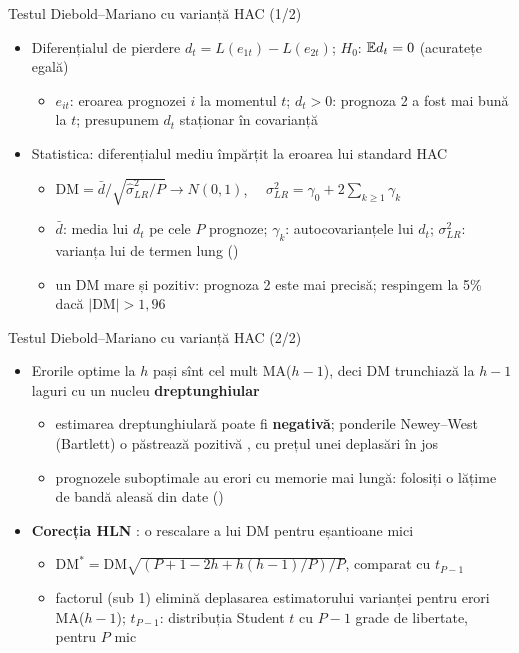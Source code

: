 \begin{frame}{Testul Diebold--Mariano cu varianță HAC (1/2)}
\itemsize{\small}
\begin{itemize}
    \item Diferențialul de pierdere $d_t = L(e_{1t}) - L(e_{2t})$; $H_0$: $\mathbb{E} d_t = 0$ (acuratețe egală)
    \begin{itemize}
        \item $e_{it}$: eroarea prognozei $i$ la momentul $t$; $d_t > 0$: prognoza 2 a fost mai bună la $t$; presupunem $d_t$ staționar în covarianță
    \end{itemize}
    \item Statistica: diferențialul mediu împărțit la eroarea lui standard HAC
    \begin{itemize}
        \item $\mathrm{DM} = \bar d/\sqrt{\hat\sigma^2_{LR}/P} \to N(0, 1)$, $\quad \sigma^2_{LR} = \gamma_0 + 2\sum_{k \ge 1}\gamma_k$
        \item $\bar d$: media lui $d_t$ pe cele $P$ prognoze; $\gamma_k$: autocovarianțele lui $d_t$; $\sigma^2_{LR}$: varianța lui de termen lung ()
        \item un DM mare și pozitiv: prognoza 2 este mai precisă; respingem la 5\% dacă $|\mathrm{DM}| > 1{,}96$
    \end{itemize}
\end{itemize}
\end{frame}

\begin{frame}{Testul Diebold--Mariano cu varianță HAC (2/2)}
\itemsize{\small}
\begin{itemize}
    \item Erorile optime la $h$ pași sînt cel mult MA($h - 1$), deci DM trunchiază la $h - 1$ laguri cu un nucleu \textbf{dreptunghiular}
    \begin{itemize}
        \item estimarea dreptunghiulară poate fi \textbf{negativă}; ponderile Newey--West (Bartlett) o păstrează pozitivă , cu prețul unei deplasări în jos
        \item prognozele suboptimale au erori cu memorie mai lungă: folosiți o lățime de bandă aleasă din date ()
    \end{itemize}
    \item \textbf{Corecția HLN} : o rescalare a lui DM pentru eșantioane mici
    \begin{itemize}
        \item $\mathrm{DM}^* = \mathrm{DM}\sqrt{(P + 1 - 2h + h(h - 1)/P)/P}$, comparat cu $t_{P-1}$
        \item factorul (sub 1) elimină deplasarea estimatorului varianței pentru erori MA($h - 1$); $t_{P-1}$: distribuția Student $t$ cu $P - 1$ grade de libertate, pentru $P$ mic
    \end{itemize}
\end{itemize}
\end{frame}

